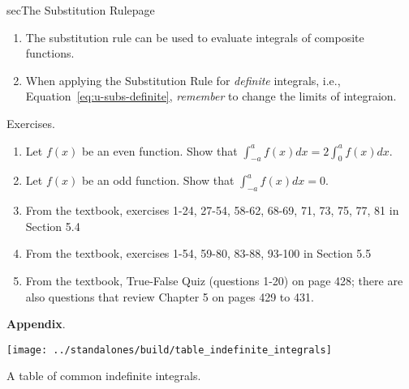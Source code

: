 \documentclass[../main]{subfiles}
\begin{document}
\begin{outline}{sec}{The Substitution Rule}{page}
\begin{enumerate}
    \item {The substitution rule can be used to evaluate integrals of composite functions.}%

    \item {When applying the Substitution Rule for \emph{definite} integrals, i.e., Equation~\eqref{eq:u-subs-definite}, \emph{remember} to change the limits of integraion.}

\end{enumerate}
\end{outline}




%
%
Exercises.
\begin{enumerate}
\item Let \(f(x)\) be an even function. Show that \(\int_{-a}^{a} f(x) dx = 2 \int_{0}^{a} f(x) dx\).
\item Let \(f(x)\) be an odd function. Show that \(\int_{-a}^{a} f(x) dx = 0\).
\item   From the textbook, exercises 1-24, 27-54, 58-62, 68-69, 71, 73, 75, 77, 81 in Section 5.4
\item   From the textbook, exercises  1-54, 59-80, 83-88, 93-100 in Section 5.5
\item From the textbook, True-False Quiz (questions 1-20) on page 428; there are also questions that review
Chapter 5 on pages 429 to 431.
\end{enumerate}

\noindent\textbf{Appendix}.
\begin{table}[h]  %
  \centering
  \texttt{[image: ../standalones/build/table\_indefinite\_integrals]}
  \caption{A table of common indefinite integrals.}
  \label{table:indefinite_integrals}
\end{table}
\end{document}
